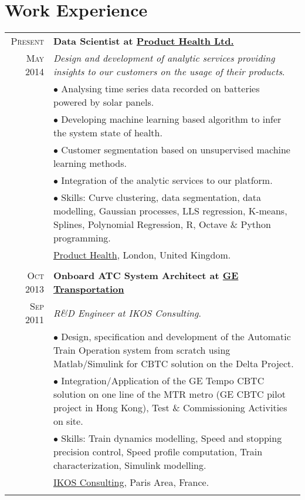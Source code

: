 \documentclass[a4paper,10pt]{article}
\begin{document}
\section{\textcolor{RedOrange}{Work Experience}}
\begin{tabular}{r|p{14cm}}


\textsc{Present}& \textbf{Data Scientist at \href{http://www.producthealth.com/}{Product Health Ltd.}}\\
\textsc{May 2014}&\emph{Design and development of analytic services providing insights to our customers on the usage of their products}.\\
& $\bullet$ {Analysing time series data recorded on batteries powered by solar panels.}\\
& $\bullet$ Developing machine learning based algorithm to infer the system state of health. \\
& $\bullet$ Customer segmentation based on unsupervised machine learning methods.\\
& $\bullet$ Integration of the analytic services to our platform. \\
& $\bullet$ Skills: Curve clustering,  data segmentation, data modelling, Gaussian processes, LLS regression, K-means, Splines, Polynomial Regression, R, Octave \& Python programming.\\
&\footnotesize{\href{http://www.producthealth.com/}{Product Health}, London, United Kingdom.}\\ \multicolumn{2}{c}{} \\


\textsc{Oct 2013}& \textbf{Onboard ATC System Architect at \href{http://www.getransportation.com/}{GE Transportation}}\\
\textsc{Sep 2011}&\emph{R\&D Engineer at IKOS Consulting}.\\
& $\bullet$ Design, specification and development of the Automatic Train Operation system from scratch using Matlab/Simulink for CBTC solution on the Delta Project.\\
& $\bullet$ Integration/Application of the GE Tempo CBTC solution on one line of the MTR metro (GE CBTC pilot project in Hong Kong), Test \& Commissioning Activities on site.\\
& $\bullet$ Skills: Train dynamics modelling, Speed and stopping precision control, Speed profile computation, Train characterization, Simulink modelling.\\
&\footnotesize{\href{http://www.ikosconsulting.com/v3/index.php}{IKOS Consulting}, Paris Area, France.}\\ \multicolumn{2}{c}{} \\


\end{tabular}
\end{document}
